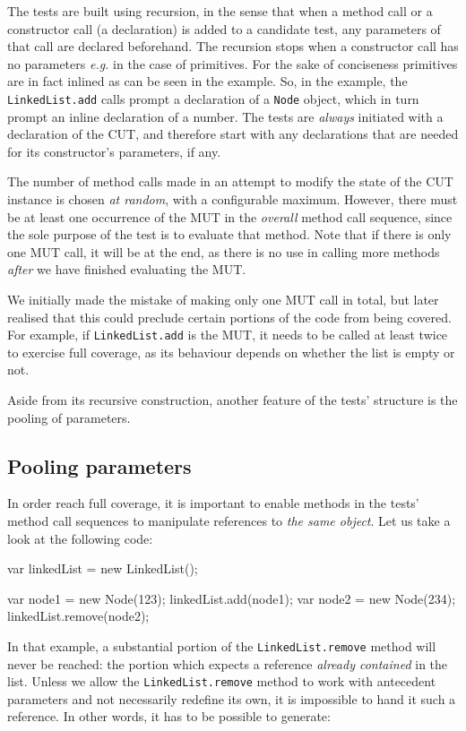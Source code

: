 The tests are built using recursion, in the sense that when a method call or a constructor call (a declaration) is added to a candidate test, any parameters of that call are declared beforehand. The recursion stops when a constructor call has no parameters \emph{e.g.} in the case of primitives. For the sake of conciseness primitives are in fact inlined as can be seen in the example. So, in the example, the \texttt{LinkedList.add} calls prompt a declaration of a \texttt{Node} object, which in turn prompt an inline declaration of a number.
The tests are \emph{always} initiated with a declaration of the CUT, and therefore start with any declarations that are needed for its constructor's parameters, if any.

The number of method calls made in an attempt to modify the state of the CUT instance is chosen \emph{at random}, with a configurable maximum. However, there must be at least one occurrence of the MUT in the \emph{overall} method call sequence, since the sole purpose of the test is to evaluate that method. Note that if there is only one MUT call, it will be at the end, as there is no use in calling more methods \emph{after} we have finished evaluating the MUT.

We initially made the mistake of making only one MUT call in total, but later realised that this could preclude certain portions of the code from being covered. For example, if \texttt{LinkedList.add} is the MUT, it needs to be called at least twice to exercise full coverage, as its behaviour depends on whether the list is empty or not.

Aside from its recursive construction, another feature of the tests' structure is the pooling of parameters.

\subsection{Pooling parameters}
In order reach full coverage, it is important to enable methods in the tests' method call sequences to manipulate references to \emph{the same object}. Let us take a look at the following code:

\begin{verbcode}
var linkedList = new LinkedList();

var node1 = new Node(123);
linkedList.add(node1);
var node2 = new Node(234);
linkedList.remove(node2);
\end{verbcode}

In that example, a substantial portion of the \texttt{LinkedList.remove} method will never be reached: the portion which expects a reference \emph{already contained} in the list. Unless we allow the \texttt{LinkedList.remove} method to work with antecedent parameters and not necessarily redefine its own, it is impossible to hand it such a reference. In other words, it has to be possible to generate:

